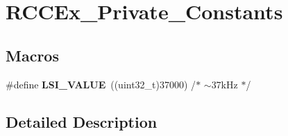 \hypertarget{group___r_c_c_ex___private___constants}{\section{R\-C\-C\-Ex\-\_\-\-Private\-\_\-\-Constants}
\label{group___r_c_c_ex___private___constants}
}
\subsection*{Macros}
\begin{DoxyCompactItemize}
\item 
\hypertarget{group___r_c_c_ex___private___constants_ga4872023e65449c0506aac3ea6bec99e9}{\#define {\bfseries L\-S\-I\-\_\-\-V\-A\-L\-U\-E}~((uint32\-\_\-t)37000)  /$\ast$ $\sim$37k\-Hz $\ast$/}\label{group___r_c_c_ex___private___constants_ga4872023e65449c0506aac3ea6bec99e9}

\end{DoxyCompactItemize}


\subsection{Detailed Description}
